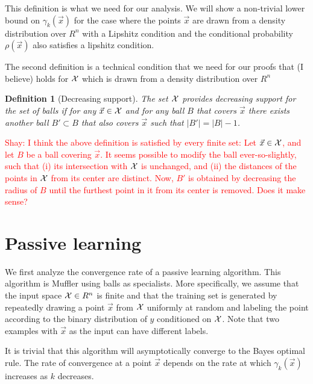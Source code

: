 \documentclass{article}
\newtheorem{definition}[theorem]{Definition}
\newcommand{\X}{{\cal X}}
\newcommand{\x}{\vec{x}}
\newcommand{\y}{\vec{y}}
\newcommand{\shay}[1]{\textcolor{red}{Shay: #1}}
\begin{document}
This definition is what we need for our analysis. We will show a
non-trivial lower bound on $\gamma_k(\x)$ for the case where the
points $\x$ are drawn from a density distribution over $R^n$ with a
Lipshitz condition and the conditional probability $\rho(\x)$ also
satisfies a lipshitz condition.


The second definition is a technical condition that we need for our
proofs that (I believe) holds for $\X$ which is drawn from a density
distribution over $R^n$
\begin{definition}[Decreasing support]
The set $\X$ provides decreasing support for the set of balls if for
any $\x \in \X$ and for any ball $B$ that covers $\x$ there exists
another ball $B' \subset B$ that also covers $\x$ such that $|B'| = |B|-1$.
\end{definition}

\shay{I think the above definition is satisfied by every finite set:
Let $\x \in \X$, and let $B$ be a ball covering $\x$. 
It seems possible to modify the ball ever-so-slightly, 
such that (i) its intersection with $\X$ is unchanged,  and (ii) the 
distances of the points in $\X$ from its center are distinct.
Now, $B'$ is obtained by decreasing the radius of $B$ until
the furthest point in it from its center is removed.  Does it make sense?}

\iffalse
We assume that $\rho$ is Lipschitz
with parameter $\alpha$, i.e. for any two vectors $\vec{x}\neq\vec{y}$.

$$\frac{\rho(\x)-\rho(\y)}{\|\x-\y\|_2} \leq \alpha$$
\fi

\section{Passive learning}

We first analyze the convergence rate of a passive learning algorithm.
This algorithm is Muffler using balls as specialists. More
specifically, we assume that the input space $\X \in R^n$ is finite
and that the training set is generated by repeatedly drawing a point
$\x$ from $\X$ uniformly at random and labeling the point according
to the binary distribution of $y$ conditioned on $\X$. Note that two
examples with $\x$ as the input can have different labels.

It is trivial that this algorithm will asymptotically converge to the
Bayes optimal rule. The rate of convergence at a point $\x$ depends on 
the rate at which $\gamma_k(\x)$ increases as $k$ decreases.
\end{document}
